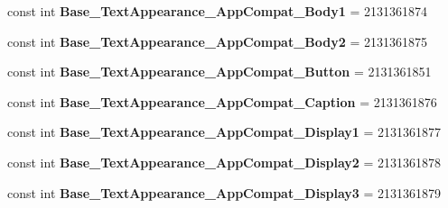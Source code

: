 \begin{DoxyCompactItemize}
\item 
\mbox{\label{class_sample_app_1_1_droid_1_1_resource_1_1_style_a00b5dc1c34c30f0b36cdb6647d505bb4}} 
const int {\bfseries Base\+\_\+\+Text\+Appearance\+\_\+\+App\+Compat\+\_\+\+Body1} = 2131361874
\item 
\mbox{\label{class_sample_app_1_1_droid_1_1_resource_1_1_style_a1a2e34be82864ce80df2a67d1c6f3ded}} 
const int {\bfseries Base\+\_\+\+Text\+Appearance\+\_\+\+App\+Compat\+\_\+\+Body2} = 2131361875
\item 
\mbox{\label{class_sample_app_1_1_droid_1_1_resource_1_1_style_afe04a6d51c3cf548f5031d63cdbc8a2f}} 
const int {\bfseries Base\+\_\+\+Text\+Appearance\+\_\+\+App\+Compat\+\_\+\+Button} = 2131361851
\item 
\mbox{\label{class_sample_app_1_1_droid_1_1_resource_1_1_style_a6ff0696e192d98e70cdcdc3a53ed7a6e}} 
const int {\bfseries Base\+\_\+\+Text\+Appearance\+\_\+\+App\+Compat\+\_\+\+Caption} = 2131361876
\item 
\mbox{\label{class_sample_app_1_1_droid_1_1_resource_1_1_style_af02d35ad168877eac2f15a9da0405f10}} 
const int {\bfseries Base\+\_\+\+Text\+Appearance\+\_\+\+App\+Compat\+\_\+\+Display1} = 2131361877
\item 
\mbox{\label{class_sample_app_1_1_droid_1_1_resource_1_1_style_ab57fdcb23542c89b96f081d1d2406837}} 
const int {\bfseries Base\+\_\+\+Text\+Appearance\+\_\+\+App\+Compat\+\_\+\+Display2} = 2131361878
\item 
\mbox{\label{class_sample_app_1_1_droid_1_1_resource_1_1_style_a81849413328c0aa6bcb359311ae11c6f}} 
const int {\bfseries Base\+\_\+\+Text\+Appearance\+\_\+\+App\+Compat\+\_\+\+Display3} = 2131361879
\item 
\mbox{\label{class_sample_app_1_1_droid_1_1_resource_1_1_style_ad5b2f98139c618c3ffcf0caf6441e10a}} 

\end{DoxyCompactItemize}
